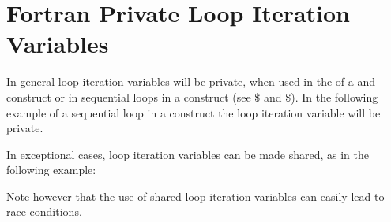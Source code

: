 \pagebreak
\chapter{Fortran Private Loop Iteration Variables}
\label{chap:fort_loopvar}
\fortranspecificstart

In general loop iteration variables will be private, when used in the  
of a  and  construct or in sequential loops in a 
 construct (see \$ and \$). In the following example of a sequential 
loop in a  construct the loop iteration variable  will 
be private.


In exceptional cases, loop iteration variables can be made shared, as in the following 
example:


Note however that the use of shared loop iteration variables can easily lead to 
race conditions.
\fortranspecificend

